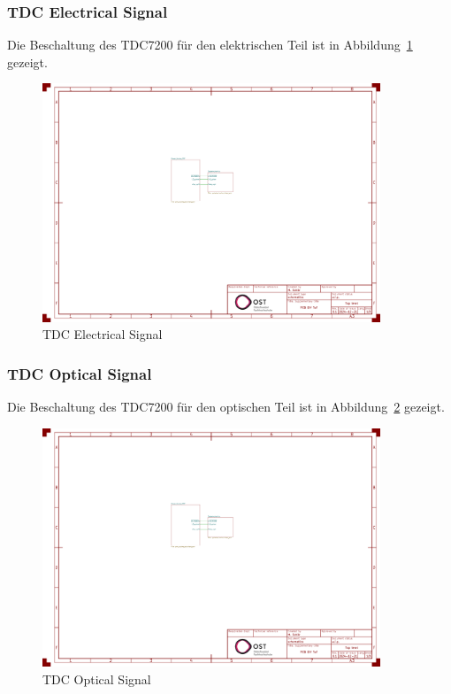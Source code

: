 \documentclass[11pt,a4paper,hidelinks]{article}
\begin{document}
\subsubsection{TDC Electrical Signal}

Die Beschaltung des TDC7200 \cite{ti2016tdc7200_datasheet} für den elektrischen Teil ist in
Abbildung~\ref{fig:tdc_ele_signal} gezeigt.

\begin{figure}[H]
    \centering
    \includegraphics[page=2, trim=80 330 750 310, clip, width=0.9\textwidth]{attachments/schematic.pdf}
    \caption{TDC Electrical Signal}\label{fig:tdc_ele_signal}
\end{figure}

\subsubsection{TDC Optical Signal}

Die Beschaltung des TDC7200 \cite{ti2016tdc7200_datasheet} für den optischen Teil ist in
Abbildung~\ref{fig:tdc_opt_signal} gezeigt.

\begin{figure}[H]
    \centering
    \includegraphics[page=2, trim=530 330 300 310, clip, width=0.9\textwidth]{attachments/schematic.pdf}
    \caption{TDC Optical Signal}\label{fig:tdc_opt_signal}
\end{figure}
\end{document}
